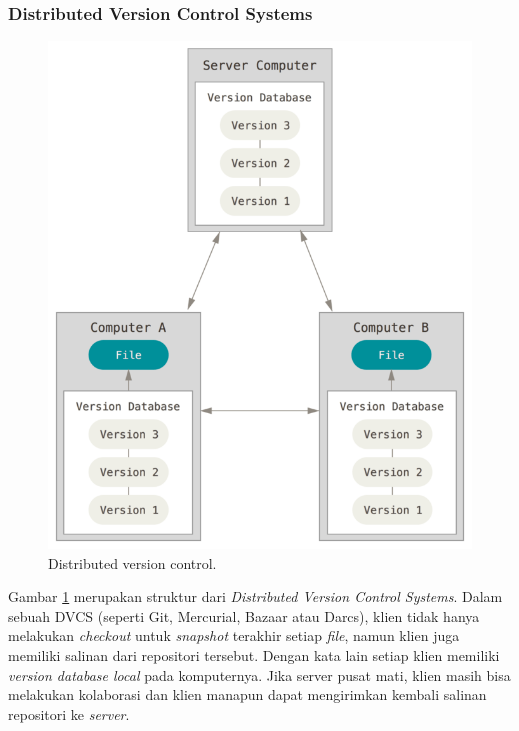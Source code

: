 \subsubsection{Distributed Version Control Systems}
\begin{figure}[H]
	\centering
		\includegraphics[scale=0.5]{Gambar/dvcs.png}
	\caption{Distributed version control\cite{chacon2014pro}.}
	\label{fig:dvcs}
\end{figure}
Gambar \ref{fig:dvcs} merupakan struktur dari \textit{Distributed Version Control Systems}. Dalam sebuah DVCS (seperti Git, Mercurial, Bazaar atau Darcs), klien tidak hanya melakukan \textit{checkout} untuk \textit{snapshot} terakhir setiap \textit{file}, namun klien juga memiliki salinan dari repositori tersebut. Dengan kata lain setiap klien memiliki \textit{version database local} pada komputernya. Jika server pusat mati, klien masih bisa melakukan kolaborasi dan klien manapun dapat mengirimkan kembali salinan repositori ke \textit{server}.

